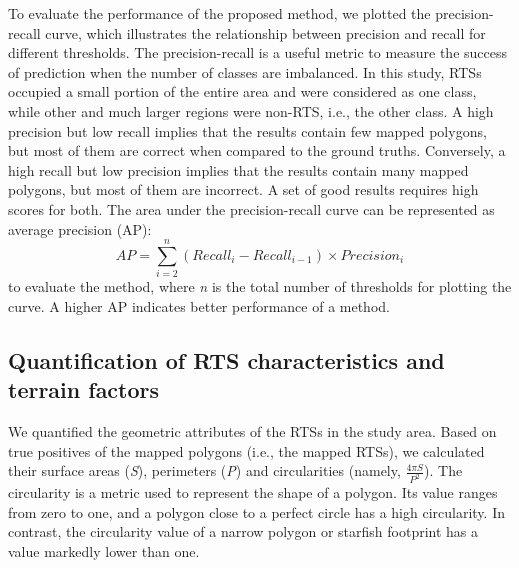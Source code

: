 \documentclass[authoryear,preprint,review,12pt]{elsarticle}
\begin{document}
To evaluate the performance of the proposed method, we plotted the precision-recall curve, which illustrates the relationship between precision and recall for different  thresholds. The precision-recall is a useful metric to measure the success of prediction when the number of classes are imbalanced. In this study, RTSs occupied a small portion of the entire area and were considered as one class, while other and much larger regions were non-RTS, i.e., the other class. A high precision but low recall implies that the results contain few mapped polygons, but most of them are correct when compared to the ground truths. Conversely, a high recall but low precision implies that the results contain many mapped polygons, but most of them are incorrect. A set of good results requires high scores for both. The area under the precision-recall curve can be represented as average precision (AP):
\begin{equation}
AP=\sum_{i=2}^{n} (Recall_i - Recall_{i-1})\times Precision_i 
\label{equ_ap}
\end{equation}
to evaluate the method, where \emph{n} is the total number of thresholds for plotting the curve. A higher AP indicates better performance of a method.


\subsection{Quantification of RTS characteristics and terrain factors}
\label{subsec_quantify_rts}

We quantified the geometric attributes of the RTSs in the study area. Based on true positives of the mapped polygons (i.e., the mapped RTSs), we calculated their surface areas (\emph{S}), perimeters (\emph{P}) and circularities (namely, $\frac{4 \pi S}{P^2} $). The circularity is a metric used to represent the shape of a polygon. Its value ranges from zero to one, and a polygon close to a perfect circle has a high circularity. In contrast, the circularity value of a narrow polygon or starfish footprint has a value markedly lower than one. 
\end{document}
